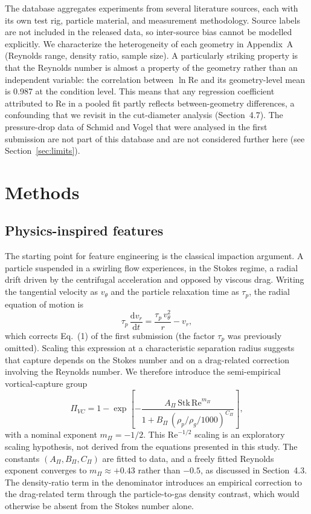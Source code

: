 \documentclass[12pt]{article}
\newcommand{\Stk}{\mathrm{Stk}}
\newcommand{\Rey}{\mathrm{Re}}
\newcommand{\PiVC}{\Pi_{VC}}
\begin{document}
The database aggregates experiments from several literature sources, each with its own test rig, particle material, and measurement methodology. Source labels are not included in the released data, so inter-source bias cannot be modelled explicitly. We characterize the heterogeneity of each geometry in Appendix~A (Reynolds range, density ratio, sample size). A particularly striking property is that the Reynolds number is almost a property of the geometry rather than an independent variable: the correlation between $\ln\Rey$ and its geometry-level mean is 0.987 at the condition level. This means that any regression coefficient attributed to Re in a pooled fit partly reflects between-geometry differences, a confounding that we revisit in the cut-diameter analysis (Section~4.7). The pressure-drop data of Schmid and Vogel that were analysed in the first submission are not part of this database and are not considered further here (see Section~\ref{sec:limits}).

\section{Methods}

\subsection{Physics-inspired features}
\label{sec:pivc}

The starting point for feature engineering is the classical impaction argument. A particle suspended in a swirling flow experiences, in the Stokes regime, a radial drift driven by the centrifugal acceleration and opposed by viscous drag. Writing the tangential velocity as $v_\theta$ and the particle relaxation time as $\tau_p$, the radial equation of motion is
\begin{equation}
\tau_p\,\frac{\mathrm{d}v_r}{\mathrm{d}t} = \frac{\tau_p\, v_\theta^2}{r} - v_r,
\label{eq:eom}
\end{equation}
which corrects Eq.~(1) of the first submission (the factor $\tau_p$ was previously omitted). Scaling this expression at a characteristic separation radius suggests that capture depends on the Stokes number and on a drag-related correction involving the Reynolds number. We therefore introduce the semi-empirical vortical-capture group
\begin{equation}
\PiVC = 1 - \exp\!\left[-\frac{A_\Pi\,\Stk\,\Rey^{m_\Pi}}{1 + B_\Pi\,(\rho_p/\rho_g / 1000)^{C_\Pi}}\right],
\label{eq:pivc}
\end{equation}
with a nominal exponent $m_\Pi = -1/2$. This $\Rey^{-1/2}$ scaling is an exploratory scaling hypothesis, not derived from the equations presented in this study. The constants $(A_\Pi, B_\Pi, C_\Pi)$ are fitted to data, and a freely fitted Reynolds exponent converges to $m_\Pi \approx +0.43$ rather than $-0.5$, as discussed in Section~4.3. The density-ratio term in the denominator introduces an empirical correction to the drag-related term through the particle-to-gas density contrast, which would otherwise be absent from the Stokes number alone.
\end{document}
